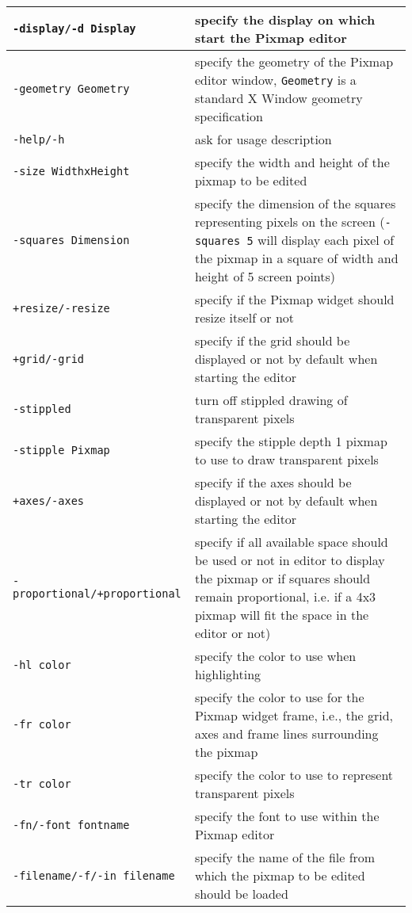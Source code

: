 \begin{tabular}{|l|p{8cm}|}
\hline
{\tt -display/-d Display}   & specify the display on which start the
Pixmap editor\\\hline
{\tt -geometry Geometry} & specify the geometry of the Pixmap editor
window, {\tt Geometry} is a standard X Window geometry
specification\\\hline
{\tt -help/-h}           & ask for usage description\\\hline
{\tt -size WidthxHeight} & specify the width and height of the pixmap
to be edited\\\hline
{\tt -squares Dimension} & specify the dimension of the squares
representing pixels on the screen ({\tt -squares 5} will display 
each pixel of the pixmap in a square of width and height of 5 screen
points)\\\hline
{\tt +resize/-resize}    & specify if the Pixmap widget should resize
itself or not\\\hline
{\tt +grid/-grid}        & specify if the grid should be displayed or not by
default when starting the editor\\\hline
{\tt -stippled}		 & turn off stippled drawing of transparent pixels\\\hline
{\tt -stipple Pixmap} 	 & specify the stipple depth 1 pixmap to use to draw
transparent pixels\\\hline
{\tt +axes/-axes}        & specify if the axes should be displayed or not by
default when starting the editor\\\hline
{\tt -proportional/+proportional} & specify if all available space
should be used or not in editor to display the pixmap or if squares
should remain proportional, i.e. if a 4x3 pixmap will fit the space in
the editor or not)\\\hline 
{\tt -hl color}          & specify the color to use when highlighting\\\hline
{\tt -fr color}          & specify the color to use for the Pixmap
widget frame, i.e., the grid, axes and frame lines surrounding the
pixmap\\\hline
{\tt -tr color} & specify the color to use to represent
transparent pixels\\\hline
{\tt -fn/-font fontname}     & specify the font to use within the Pixmap
editor\\\hline
{\tt -filename/-f/-in filename} & specify the name of the file from
which the pixmap to be edited should be loaded\\\hline
\end{tabular}\\

